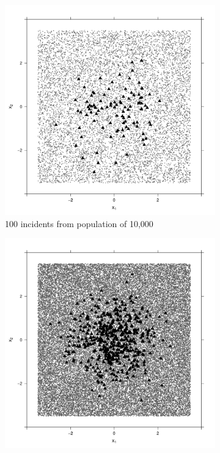 \begin{figure}[htbp]
    \centering
    \begin{subfigure}{0.45\textwidth}
        \includegraphics[width=\textwidth]{results/unif10k_100_1.0_1h/output/population_and_incidents_scatter}
        \caption{100 incidents from population of 10,000}
    \end{subfigure}
    \begin{subfigure}{0.45\textwidth}
        \includegraphics[width=\textwidth]{results/unif50k_500_1.0_1h/output/population_and_incidents_scatter}

\end{subfigure}
\end{figure}

